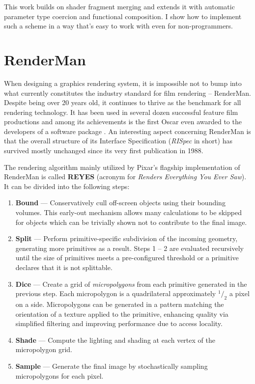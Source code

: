 This work builds on shader fragment merging and extends it with automatic parameter type coercion and functional composition. I show how to implement such a scheme in a way that's easy to work with even for non-programmers.


\section{RenderMan}


When designing a graphics rendering system, it is impossible not to bump into what currently constitutes the industry standard for film rendering -- RenderMan. Despite being over 20 years old, it continues to thrive as the benchmark for all rendering technology. It has been used in several dozen successful feature film productions and among its achievements is the first Oscar even awarded to the developers of a software package \cite{RenderManAwards}. An interesting aspect concerning RenderMan is that the overall structure of its Interface Specification (\emph{RISpec} in short) has survived mostly unchanged since its very first publication in 1988.

The rendering algorithm mainly utilized by Pixar's flagship implementation of RenderMan is called \textbf{REYES} (acronym for \emph{Renders Everything You Ever Saw}). It can be divided into the following steps:
	
\begin{enumerate}
\item \textbf{Bound} --- Conservatively cull off-screen objects using their bounding volumes. This early-out mechanism allows many calculations to be skipped for objects which can be trivially shown not to contribute to the final image.
\item \textbf{Split} --- Perform primitive-specific subdivision of the incoming geometry, generating more primitives as a result. Steps 1 -- 2 are evaluated recursively until the size of primitives meets a pre-configured threshold or a primitive declares that it is not splittable.
\item \textbf{Dice} --- Create a grid of \emph{micropolygons} from each primitive generated in the previous step. Each micropolygon is a quadrilateral approximately $^1/_2$ a pixel on a side. Micropolygons can be generated in a pattern matching the orientation of a texture applied to the primitive, enhancing quality via simplified filtering and improving performance due to access locality.
\item \textbf{Shade} --- Compute the lighting and shading at each vertex of the micropolygon grid.
\item \textbf{Sample} --- Generate the final image by stochastically sampling micropolygons for each pixel.
\end{enumerate}

